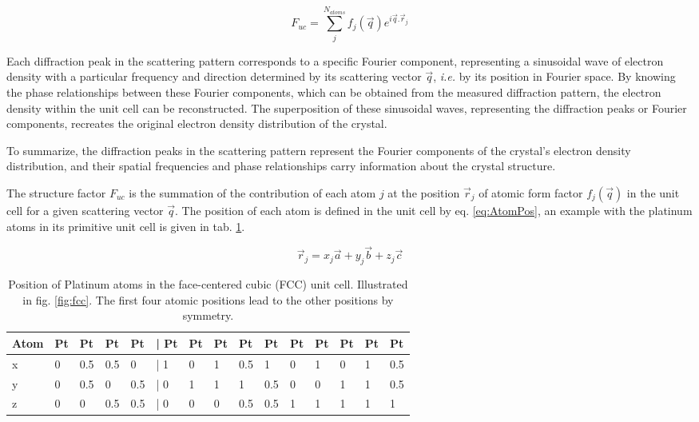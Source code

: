 \begin{equation}
    \label{eq:StrucFactor}
    F_{uc} = \sum_j^{N_{atoms}} f_j(\vec{q}) e^{i\vec{q}.\vec{r}_j}
\end{equation}

Each diffraction peak in the scattering pattern corresponds to a specific Fourier component, representing a sinusoidal wave of electron density with a particular frequency and direction determined by its scattering vector $\vec{q}$, \textit{i.e.} by its position in Fourier space.
By knowing the phase relationships between these Fourier components, which can be obtained from the measured diffraction pattern, the electron density within the unit cell can be reconstructed.
The superposition of these sinusoidal waves, representing the diffraction peaks or Fourier components, recreates the original electron density distribution of the crystal.

To summarize, the diffraction peaks in the scattering pattern represent the Fourier components of the crystal's electron density distribution, and their spatial frequencies and phase relationships carry information about the crystal structure.

The structure factor $F_{uc}$ is the summation of the contribution of each atom $j$ at the position $\vec{r}_j$ of atomic form factor $f_j(\vec{q})$ in the unit cell for a given scattering vector $\vec{q}$.
The position of each atom is defined in the unit cell by eq. \ref{eq:AtomPos}, an example with the platinum atoms in its primitive unit cell is given in tab. \ref{tab:PtAtoms}.

\begin{equation}
    \label{eq:AtomPos}
    \vec{r}_j = x_j\vec{a} + y_j\vec{b} + z_j\vec{c}
\end{equation}

\begin{table}[!htb]
    \centering
    \begin{tabular}{@{}lllllllllllllll@{}}
    \toprule
    Atom & Pt & Pt  & Pt  & Pt  & | Pt & Pt & Pt & Pt  & Pt  & Pt & Pt & Pt & Pt & Pt  \\ \midrule
    x    & 0  & 0.5 & 0.5 & 0   & | 1  & 0  & 1  & 0.5 & 1   & 0  & 1  & 0  & 1  & 0.5 \\
    y    & 0  & 0.5 & 0   & 0.5 & | 0  & 1  & 1  & 1   & 0.5 & 0  & 0  & 1  & 1  & 0.5 \\
    z    & 0  & 0   & 0.5 & 0.5 & | 0  & 0  & 0  & 0.5 & 0.5 & 1  & 1  & 1  & 1  & 1   \\ \bottomrule
    \end{tabular}
    \caption{Position of Platinum atoms in the face-centered cubic (FCC) unit cell. Illustrated in fig. \ref{fig:fcc}. The first four atomic positions  lead to the other positions by symmetry.}
    \label{tab:PtAtoms}
\end{table}

